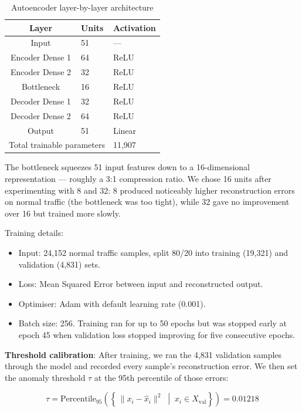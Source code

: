\documentclass[12pt,a4paper]{report}
\begin{document}
\begin{table}[H]
\centering
\caption{Autoencoder layer-by-layer architecture}
\label{tab:ae_arch}
\begin{tabular}{cll}
\toprule
\textbf{Layer} & \textbf{Units} & \textbf{Activation} \\
\midrule
Input           & 51  & --- \\
Encoder Dense 1 & 64  & ReLU \\
Encoder Dense 2 & 32  & ReLU \\
Bottleneck      & 16  & ReLU \\
Decoder Dense 1 & 32  & ReLU \\
Decoder Dense 2 & 64  & ReLU \\
Output          & 51  & Linear \\
\midrule
\multicolumn{2}{l}{Total trainable parameters} & 11,907 \\
\bottomrule
\end{tabular}
\end{table}

\noindent The bottleneck squeezes 51 input features down to a 16-dimensional
representation — roughly a 3:1 compression ratio. We chose 16 units after
experimenting with 8 and 32: 8 produced noticeably higher reconstruction errors
on normal traffic (the bottleneck was too tight), while 32 gave no improvement
over 16 but trained more slowly.

\noindent Training details:
\begin{itemize}
  \item Input: 24,152 normal traffic samples, split 80/20 into training
        (19,321) and validation (4,831) sets.
  \item Loss: Mean Squared Error between input and reconstructed output.
  \item Optimiser: Adam with default learning rate (0.001).
  \item Batch size: 256. Training ran for up to 50 epochs but was stopped
        early at epoch 45 when validation loss stopped improving for five
        consecutive epochs.
\end{itemize}

\noindent \textbf{Threshold calibration}: After training, we ran the 4,831
validation samples through the model and recorded every sample's reconstruction
error. We then set the anomaly threshold $\tau$ at the 95th percentile of those
errors:

\begin{equation}
  \tau = \text{Percentile}_{95}\!\left(\left\{\,\|x_i - \hat{x}_i\|^2
  \;\middle|\; x_i \in X_{\text{val}}\right\}\right) = 0.01218
\end{equation}
\end{document}

